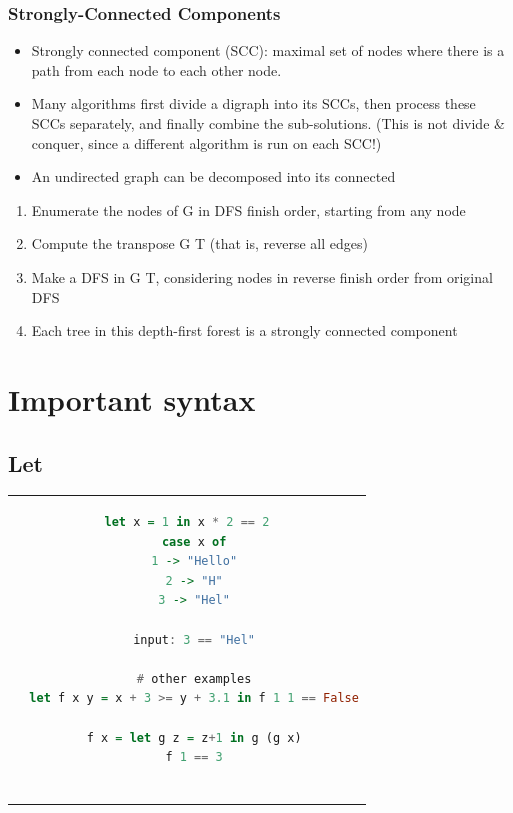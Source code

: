 \begin{multicols}{2}
\subsubsection{Strongly-Connected Components}
\begin{itemize}
\item Strongly connected component (SCC): maximal set of nodes
  where there is a path from each node to each other node.
\item Many algorithms first divide a digraph into its SCCs, then process
  these SCCs separately, and finally combine the sub-solutions.
  (This is not divide \& conquer, since a different algorithm is run on each SCC!)
\item An undirected graph can be decomposed into its connected
\end{itemize}

\begin{enumerate}
\item Enumerate the nodes of G in DFS finish order, starting from any node
\item Compute the transpose G T (that is, reverse all edges)
\item Make a DFS in G T, considering nodes in reverse finish order from
  original DFS
\item Each tree in this depth-first forest is a strongly connected component
\end{enumerate}
\end{multicols}


\section{Important syntax}
\subsection{Let}
\begin{center}
\begin{tabular}{c}
\begin{lstlisting}[language=Haskell]
  let x = 1 in x * 2 == 2
  case x of
  1 -> "Hello"
  2 -> "H"
  3 -> "Hel"

  input: 3 == "Hel"
  
  # other examples
  let f x y = x + 3 >= y + 3.1 in f 1 1 == False

  f x = let g z = z+1 in g (g x)
  f 1 == 3
  
\end{lstlisting}
\end{tabular}
\end{center}
 
